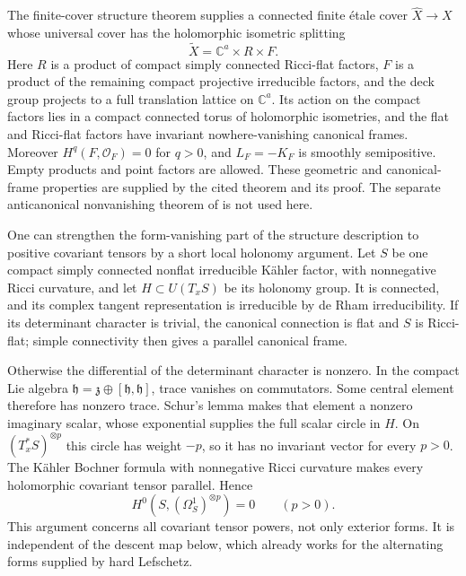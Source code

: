 The finite-cover structure theorem
\cite[Theorem~2.1]{CompanionH}
supplies a
connected finite \'etale cover $\widehat X\to X$ whose universal cover
has the holomorphic isometric splitting
\[
 \widetilde X=\mathbb C^a\times R\times F.
\]
Here $R$ is a product of compact simply connected Ricci-flat factors,
$F$ is a product of the remaining compact projective irreducible
factors, and the deck group projects to a full translation lattice on
$\mathbb C^a$.  Its action on the compact factors lies in a compact
connected torus of holomorphic isometries, and the flat and Ricci-flat
factors have invariant nowhere-vanishing canonical frames.  Moreover
$H^q(F,\mathcal O_F)=0$ for $q>0$, and $L_F=-K_F$ is smoothly
semipositive.  Empty products and point factors are allowed.
These geometric and canonical-frame properties are supplied by the
cited theorem and its proof. The separate anticanonical nonvanishing
theorem of \cite[Theorem~1.1]{CompanionH} is not used here.

\begin{remark}\label{inv:tensor-holonomy}
One can strengthen the form-vanishing part of the structure description
to positive covariant tensors by a short local holonomy argument.
Let $S$ be one compact simply connected nonflat irreducible K\"ahler
factor, with nonnegative Ricci curvature, and let
$H\subset U(T_xS)$ be its holonomy group.  It is connected, and its
complex tangent representation is irreducible by de Rham
irreducibility.  If its determinant character is trivial, the canonical
connection is flat and $S$ is Ricci-flat; simple connectivity then
gives a parallel canonical frame.

Otherwise the differential of the determinant character is nonzero.
In the compact Lie algebra
$\mathfrak h=\mathfrak z\oplus[\mathfrak h,\mathfrak h]$, trace
vanishes on commutators.  Some central element therefore has nonzero
trace.  Schur's lemma makes that element a nonzero imaginary scalar,
whose exponential supplies the full scalar circle in $H$.
On $(T_x^*S)^{\otimes p}$ this circle has weight $-p$, so it has no
invariant vector for every $p>0$.  The K\"ahler Bochner formula with
nonnegative Ricci curvature makes every holomorphic covariant tensor
parallel.  Hence
\[
 H^0(S,(\Omega_S^1)^{\otimes p})=0\qquad(p>0).
\]
This argument concerns all covariant tensor powers, not only exterior
forms.  It is independent of the descent map below, which already
works for the alternating forms supplied by hard Lefschetz.
\end{remark}

